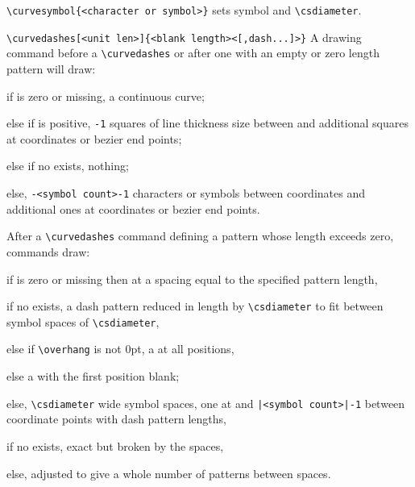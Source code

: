      \begin{hanging}
     \verb?\curvesymbol{<character or symbol>}? sets symbol and
  \verb?\csdiameter?.

   \verb?\curvedashes[<unit len>]{<blank length><[,dash...]>}? A drawing
command before a \verb?\curvedashes? or after one with an empty or zero length
pattern will draw:

     \begin{hanging}

  if {\tt <symbol count>} is zero or missing, a continuous curve;

else if {\tt <symbol count>} is positive, {\tt <symbol count>-1} squares of
line thickness size between and additional squares at coordinates or bezier
end points;

else if no {\tt <character or symbol>} exists, nothing;

  else, {\tt -<symbol count>-1} characters or symbols between coordinates and
additional ones at coordinates or bezier end points.

      \end{hanging}
  After a \verb?\curvedashes? command defining a pattern whose length exceeds
zero, commands draw:

     \begin{hanging}

if {\tt <symbol count>} is zero or missing then at a spacing equal to the
specified pattern length,

      \begin{hanging}
  if no {\tt <character or symbol>} exists, a dash pattern reduced in length
by \verb?\csdiameter? to fit between symbol spaces of \verb?\csdiameter?,

  else if \verb?\overhang? is not 0pt, a {\tt <character or symbol>} at all
positions,

  else a {\tt <character or symbol>} with the first position blank;

        \end{hanging}

else, \verb?\csdiameter? wide symbol spaces, one at and
  {\tt |<symbol count>|-1} between coordinate points with dash pattern
lengths,
   \begin{hanging}
   if no {\tt <character or symbol>} exists, exact but broken by the spaces,

else, adjusted to give a whole number of patterns between spaces.
   \end{hanging}
        \end{hanging}



\end{hanging}
